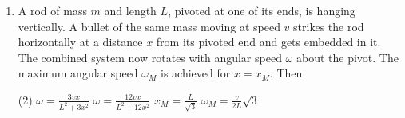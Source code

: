 
\begin{enumerate}
    \item A rod of mass $m$ and length $L$, pivoted at one of its ends, is hanging vertically. A bullet of the same mass moving at speed $v$ strikes the rod horizontally at a distance $x$ from its pivoted end and gets embedded in it. The combined system now rotates with angular speed $\omega$ about the pivot. The maximum angular speed $\omega_M$ is achieved for $x = x_M$. Then
        \begin{tasks}(2)
            \task $\omega = \frac{3vx}{L^2+3x^2}$
            \task $\omega = \frac{12vx}{L^2+12x^2}$
            \task $x_M = \frac{L}{\sqrt{3}}$
            \task $\omega_M = \frac{v}{2L}\sqrt{3}$
        \end{tasks}
\end{enumerate}
\begin{center}
\end{center}
